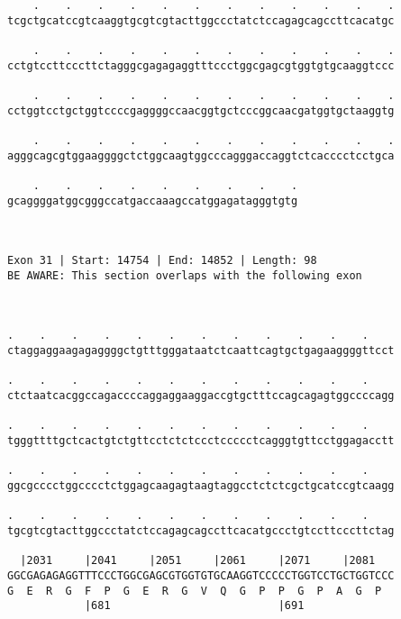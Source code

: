 \documentclass{article}
\begin{document}
\begin{Verbatim}
    .    .    .    .    .    .    .    .    .    .    .    .
tcgctgcatccgtcaaggtgcgtcgtacttggccctatctccagagcagccttcacatgc
                                                            
    .    .    .    .    .    .    .    .    .    .    .    .
cctgtccttcccttctagggcgagagaggtttccctggcgagcgtggtgtgcaaggtccc
                                                            
    .    .    .    .    .    .    .    .    .    .    .    .
cctggtcctgctggtccccgaggggccaacggtgctcccggcaacgatggtgctaaggtg
                                                            
    .    .    .    .    .    .    .    .    .    .    .    .
agggcagcgtggaaggggctctggcaagtggcccagggaccaggtctcacccctcctgca
                                                            
    .    .    .    .    .    .    .    .    .
gcaggggatggcgggccatgaccaaagccatggagatagggtgtg
                                             
                                             
 
Exon 31 | Start: 14754 | End: 14852 | Length: 98
BE AWARE: This section overlaps with the following exon



.    .    .    .    .    .    .    .    .    .    .    .    
ctaggaggaagagaggggctgtttgggataatctcaattcagtgctgagaaggggttcct
                                                            
.    .    .    .    .    .    .    .    .    .    .    .    
ctctaatcacggccagaccccaggaggaaggaccgtgctttccagcagagtggccccagg
                                                            
.    .    .    .    .    .    .    .    .    .    .    .    
tgggttttgctcactgtctgttcctctctccctccccctcagggtgttcctggagacctt
                                                            
.    .    .    .    .    .    .    .    .    .    .    .    
ggcgcccctggcccctctggagcaagagtaagtaggcctctctcgctgcatccgtcaagg
                                                            
.    .    .    .    .    .    .    .    .    .    .    .    
tgcgtcgtacttggccctatctccagagcagccttcacatgccctgtccttcccttctag
                                                            
  |2031     |2041     |2051     |2061     |2071     |2081   
GGCGAGAGAGGTTTCCCTGGCGAGCGTGGTGTGCAAGGTCCCCCTGGTCCTGCTGGTCCC
G  E  R  G  F  P  G  E  R  G  V  Q  G  P  P  G  P  A  G  P  
            |681                          |691              
  

\end{Verbatim}
\end{document}
